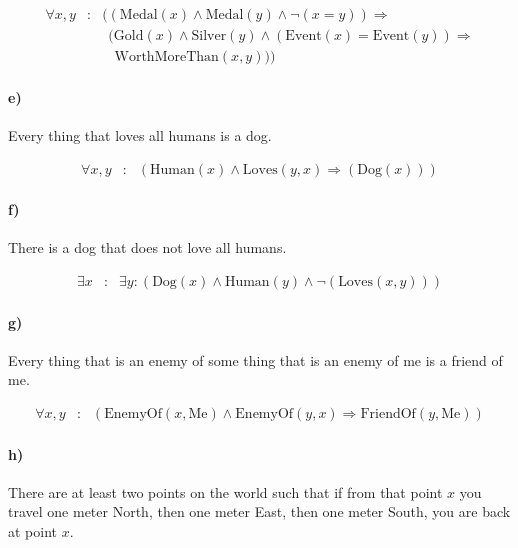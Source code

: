 \documentclass[12pt,letterpaper,leqno]{article}
\newcommand\myand{\wedge}
\newcommand\mynot{\neg}
\renewcommand\implies{\Rightarrow}
\begin{document}
\begin{eqnarray*}
\forall x, y &:& ((\text{Medal}(x) \myand \text{Medal}(y) \myand \mynot(x=y)) \implies \\
&& ~~(\text{Gold}(x) \myand \text{Silver}(y) \myand (\text{Event}(x) = \text{Event}(y)) \implies \\
&& ~~~~\text{WorthMoreThan}(x, y))
)
\end{eqnarray*}

\paragraph{e)} Every thing that loves all humans is a dog.

\begin{eqnarray*}
\forall x, y &:& (\text{Human}(x) \myand \text{Loves}(y, x) \implies (\text{Dog}(x)))
\end{eqnarray*}

\paragraph{f)} There is a dog that does not love all humans.

\begin{eqnarray*}
\exists x &:& \exists y : (\text{Dog}(x) \myand \text{Human}(y) \myand \mynot(\text{Loves}(x, y)))
\end{eqnarray*}

\paragraph{g)} Every thing that is an enemy of some thing that is an enemy of me is a friend of me.

\begin{eqnarray*}
\forall x, y &:& (\text{EnemyOf}(x, \text{Me}) \myand \text{EnemyOf}(y, x) \implies \text{FriendOf}(y, \text{Me}))
\end{eqnarray*}

\paragraph{h)} There are at least two points on the world such that if from that point $x$ you travel one meter North, then one meter East, then one meter South, you are back at point $x$.

\end{document}
